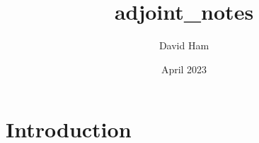 \documentclass{article}
\title{adjoint_notes}
\author{David Ham}
\date{April 2023}
\begin{document}
\maketitle

\section{Introduction}
\end{document}
